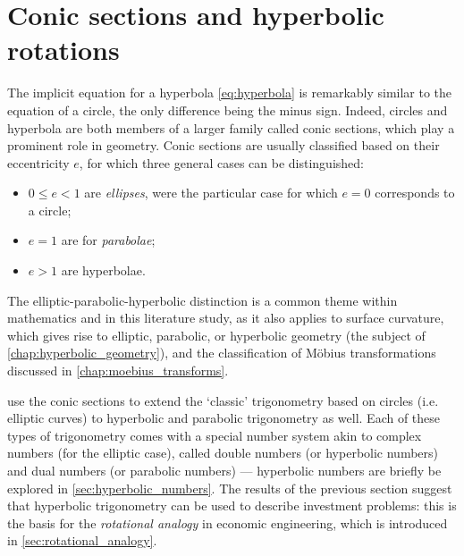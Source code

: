 \section{Conic sections and hyperbolic rotations}
\label{sec:hyperbolic_rotations}
The implicit equation for a hyperbola \cref{eq:hyperbola} is remarkably similar to the equation of a circle, the only difference being the minus sign. Indeed, circles and hyperbola are both members of a larger family called conic sections, which play a prominent role in geometry. Conic sections are usually classified based on their eccentricity $e$, for which three general cases can be distinguished:
\begin{itemize}[itemsep=0.3ex,topsep=0.3ex]
    \item $0 \leq e < 1$ are \emph{ellipses}, were the particular case for which $e = 0$ corresponds to a circle;
    \item $e = 1$ are for \emph{parabolae};
    \item $e > 1$ are hyperbolae.
\end{itemize}
The elliptic-parabolic-hyperbolic distinction is a common theme within mathematics and in this literature study, as it also applies to surface curvature, which gives rise to elliptic, parabolic, or hyperbolic geometry (the subject of \cref{chap:hyperbolic_geometry}), and the classification of Möbius transformations discussed in \cref{chap:moebius_transforms}.

\citet{Harkin2004} use the conic sections to extend the `classic' trigonometry based on circles (i.e. elliptic curves) to hyperbolic and parabolic trigonometry as well. Each of these types of trigonometry comes with a special number system akin to complex numbers (for the elliptic case), called double numbers (or hyperbolic numbers) and dual numbers (or parabolic numbers) --- hyperbolic numbers are briefly be explored in \cref{sec:hyperbolic_numbers}. The results of the previous section suggest that hyperbolic trigonometry can be used to describe investment problems: this is the basis for the \emph{rotational analogy} in economic engineering, which is introduced in \cref{sec:rotational_analogy}.

